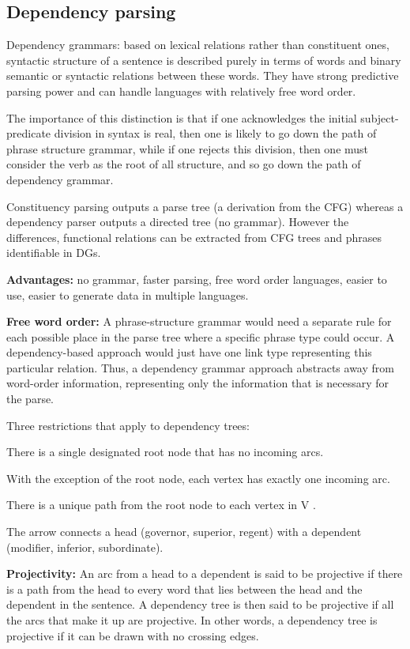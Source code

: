 \documentclass[12pt]{article}
\begin{document}
\subsection{Dependency parsing}
Dependency grammars: based on lexical relations rather than constituent ones, syntactic structure of a sentence is described purely in terms of words and binary semantic or syntactic relations between these words. They have strong predictive parsing power and can handle languages with relatively free word order.
\par The importance of this distinction is that if one acknowledges the initial subject-predicate division in syntax is real, then one is likely to go down the path of phrase structure grammar, while if one rejects this division, then one must consider the verb as the root of all structure, and so go down the path of dependency grammar.
\par Constituency parsing outputs a parse tree (a derivation from the CFG) whereas a dependency parser outputs a directed tree (no grammar). However the differences, functional relations can be extracted from CFG trees and phrases identifiable in DGs.
\par \textbf{Advantages:} no grammar, faster parsing, free word order languages, easier to use, easier to generate data in multiple languages.
\par \textbf{Free word order:} A phrase-structure grammar would need a separate rule for each possible place in the parse tree where a specific phrase type could occur. A dependency-based approach would just have one link type representing this particular relation. Thus, a dependency grammar approach abstracts away from word-order information, representing only the information that is necessary for the parse.
\par Three restrictions that apply to dependency trees:
\olb
\item There is a single designated root node that has no incoming arcs.
\item With the exception of the root node, each vertex has exactly one incoming arc.
\item There is a unique path from the root node to each vertex in V .
\ole
\par The arrow connects a head (governor, superior, regent) with a dependent (modifier, inferior, subordinate).
\par \textbf{Projectivity: } An arc from a head to a dependent is said to be projective if there is a path from the head to every word that lies between the head and the dependent in the sentence. A dependency tree is then said to be projective if all the arcs that make it up are projective. In other words, a dependency tree is projective if it can be drawn with no crossing edges.
\end{document}
